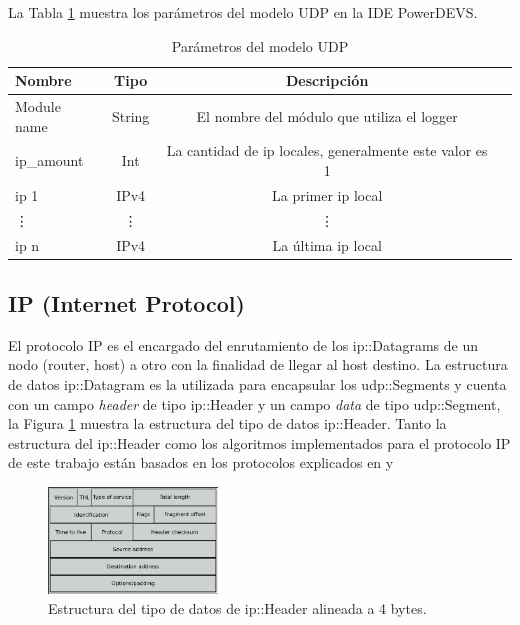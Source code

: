 \documentclass[10pt,a4paper]{article}
\begin{document}
La Tabla \ref{table: parameters UDP} muestra los parámetros del modelo UDP en la IDE PowerDEVS.
\begin{table}[h]
\begin{tabular}{|l|c|c|c|}
  \hline
  \textbf{Nombre} & \textbf{Tipo} & \textbf{Descripción} \\
  \hline
  Module name & String & El nombre del módulo que utiliza el logger \\
  \hline
  ip\_amount & Int & La cantidad de ip locales, generalmente este valor es 1 \\
  \hline
  ip 1 & IPv4 & La primer ip local \\
  \hline
  \vdots & \vdots & \vdots \\
  \hline
  ip n & IPv4 & La última ip local \\
  \hline
\end{tabular}
\caption{Parámetros del modelo UDP}
\label{table: parameters UDP}
\end{table}

\subsection{IP (Internet Protocol)}

El protocolo IP es el encargado del enrutamiento de los ip::Datagrams de un nodo (router, host) a otro con la finalidad de llegar al host destino. La estructura de datos ip::Datagram es la utilizada para encapsular los udp::Segments y cuenta con un campo \textit{header} de tipo ip::Header y un campo \textit{data} de tipo udp::Segment, la Figura \ref{figure: ip header} muestra la estructura del tipo de datos ip::Header. Tanto la estructura del ip::Header como los algoritmos implementados para el protocolo IP de este trabajo están basados en los protocolos explicados en \cite{routingtablemicrosoft} y \cite{routingprocessmicrosoft} \\

\begin{figure}[!htb]
    \centering
    \includegraphics[width = 0.4\textwidth]{img/png/IP-datagram.png}
    \caption{Estructura del tipo de datos de ip::Header alineada a 4 bytes.}
    \label{figure: ip header}
\end{figure}
\end{document}
